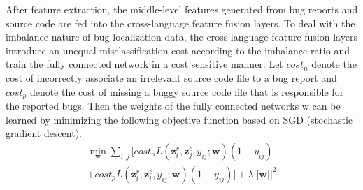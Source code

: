 After feature extraction, the middle-level features generated from bug reports and source code are fed into the cross-language feature fusion layers. To deal with the imbalance nature of bug localization data, the cross-language feature fusion layers introduce an unequal misclassification cost according to the imbalance ratio and train the fully connected network in a cost sensitive manner. Let $cost_n$ denote the cost of incorrectly associate an irrelevant source code file to a bug report and $cost_p$ denote the cost of missing a buggy source code file that is responsible for the reported bugs. Then the weights of the fully connected networks w can be learned by minimizing the following objective function based on SGD (stochastic gradient descent).
\begin{equation}
\begin{aligned}
\label{eq:cost2}
\mathop{\min}_{\mathbf{w}}\sum_{i,j}{[cost_n L(\mathbf{z}^{r}_i, \mathbf{z}^{c}_j, y_{ij}; \mathbf{w})(1-y_{ij})} \\
 {+cost_p L(\mathbf{z}^{r}_i, \mathbf{z}^{c}_i, y_{ij}; \mathbf{w})(1+y_{ij})]}+\lambda||\mathbf{w}||^2
\end{aligned}
\end{equation}

